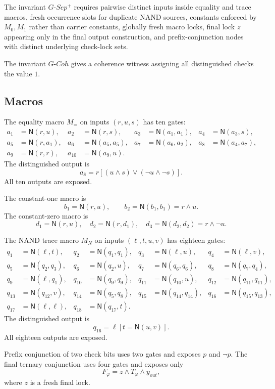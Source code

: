 \documentclass[10.5pt,a4paper]{article}
\newcommand{\NAND}{\mathsf{N}}
\begin{document}
The invariant \(G\text{-}Sep^+\) requires pairwise distinct inputs inside equality and trace macros, fresh occurrence slots for duplicate NAND sources, constants enforced by \(M_0,M_1\) rather than carrier constants, globally fresh macro locks, final lock \(z\) appearing only in the final output construction, and prefix-conjunction nodes with distinct underlying check-lock sets.

The invariant \(G\text{-}Coh\) gives a coherence witness assigning all distinguished checks the value \(1\).

\subsection{Macros}
The equality macro \(M_=\) on inputs \((r,u,s)\) has ten gates:
\[
\begin{aligned}
a_1&=\NAND(r,u),& a_2&=\NAND(r,s),& a_3&=\NAND(a_1,a_1),& a_4&=\NAND(a_3,s),\\
a_5&=\NAND(r,a_1),& a_6&=\NAND(a_5,a_5),& a_7&=\NAND(a_6,a_2),& a_8&=\NAND(a_4,a_7),\\
a_9&=\NAND(r,r),& a_{10}&=\NAND(a_9,u).
\end{aligned}
\]
The distinguished output is
\[
a_8=r[(u\wedge s)\vee(\neg u\wedge\neg s)].
\]
All ten outputs are exposed.

The constant-one macro is
\[
b_1=\NAND(r,u),\qquad b_2=\NAND(b_1,b_1)=r\wedge u.
\]
The constant-zero macro is
\[
d_1=\NAND(r,u),\quad d_2=\NAND(r,d_1),\quad d_3=\NAND(d_2,d_2)=r\wedge\neg u.
\]

The NAND trace macro \(M_N\) on inputs \((\ell,t,u,v)\) has eighteen gates:
\[
\begin{aligned}
q_1&=\NAND(\ell,t),& q_2&=\NAND(q_1,q_1),& q_3&=\NAND(\ell,u),& q_4&=\NAND(\ell,v),\\
q_5&=\NAND(q_2,q_3),& q_6&=\NAND(q_2,u),& q_7&=\NAND(q_6,q_6),& q_8&=\NAND(q_7,q_4),\\
q_9&=\NAND(\ell,q_1),& q_{10}&=\NAND(q_9,q_9),& q_{11}&=\NAND(q_{10},u),& q_{12}&=\NAND(q_{11},q_{11}),\\
q_{13}&=\NAND(q_{12},v),& q_{14}&=\NAND(q_5,q_8),& q_{15}&=\NAND(q_{14},q_{14}),& q_{16}&=\NAND(q_{15},q_{13}),\\
q_{17}&=\NAND(\ell,\ell),& q_{18}&=\NAND(q_{17},t).
\end{aligned}
\]
The distinguished output is
\[
q_{16}=\ell[t=\NAND(u,v)].
\]
All eighteen outputs are exposed.

Prefix conjunction of two check bits uses two gates and exposes \(p\) and \(\neg p\). The final ternary conjunction uses four gates and exposes only
\[
F_\varphi=z\wedge T_\varphi\wedge y_{out},
\]
where \(z\) is a fresh final lock.
\end{document}

